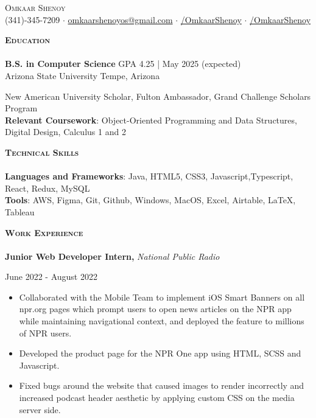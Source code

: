 \documentclass[a4paper]{article}
\newcommand{\lineunder} {
    \vspace*{-8pt} \\
    \hspace*{-18pt} \hrulefill \\
}
\newcommand{\header} [1] {
    {\hspace*{-15pt}\vspace*{3pt} \textsc{#1}}
    \vspace*{-6pt} \lineunder
}
\begin{document}
\vspace*{-30.9pt}



{\begin{center}
	{\Huge \scshape {Omkaar Shenoy}}\\
	\vspace{2mm}
	\faPhone  \hspace{0.5mm} (341)-345-7209 $\cdot$ \href{mailto:omkaarshenoyos@gmail.com}{\faEnvelope \hspace{0.5mm} omkaarshenoyos@gmail.com} \hspace{0.5mm}   $\cdot$ \href{https://www.linkedin.com/in/OmkaarShenoy/}{\faLinkedin/OmkaarShenoy} $\cdot$ \href{https://github.com/OmkaarShenoy}{\faGithub/OmkaarShenoy}
	
\end{center}


    \header{\textbf{Education}}

    \textbf{B.S. in Computer Science} \hfill GPA 4.25 | May 2025 (expected)
\\ Arizona State University \hfill Tempe, Arizona
 
New American University Scholar, Fulton Ambassador, Grand Challenge Scholars Program\\
\textbf{Relevant Coursework}: Object-Oriented Programming and Data Structures, Digital Design, Calculus 1 and 2 \\


\vspace{1mm}

\header{\textbf{Technical Skills}}

\textbf{Languages and Frameworks}: Java, HTML5, CSS3, Javascript,Typescript, React, Redux, MySQL \\
\textbf{Tools}: AWS, Figma, Git, Github, Windows, MacOS, Excel, Airtable, \LaTeX, Tableau \\
\vspace{1mm}


\vspace{-1mm}
    \header{\textbf{Work Experience}}
    \textbf{Junior Web Developer Intern, } \textit{National Public Radio} }   \hfill June 2022 - August 2022\\
\vspace{-3mm}
\begin{itemize}
    \itemsep-0.05em
     \item Collaborated with the Mobile Team to implement iOS Smart Banners on all npr.org pages which prompt users to open news articles on the NPR app while maintaining navigational context, and deployed the feature to millions of NPR users. 
    \item Developed the product page for the NPR One app using HTML, SCSS and Javascript. 
    \item Fixed bugs around the website that caused images to render incorrectly and increased podcast header aesthetic by applying custom CSS on the media server side. 
\end{itemize}
\end{document}
